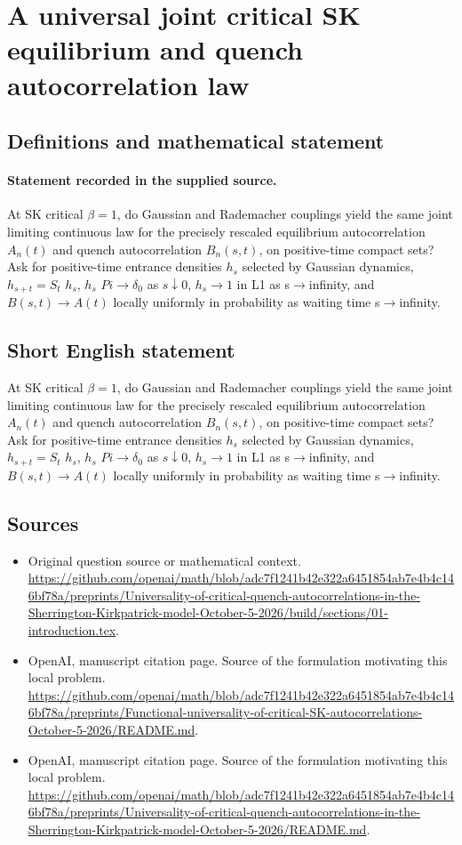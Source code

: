 \documentclass[11pt]{article}
\begin{document}
\section*{A universal joint critical SK equilibrium and quench autocorrelation law}\label{statement}
\subsection{Definitions and mathematical statement}
\paragraph{Statement recorded in the supplied source.}
At SK critical $\beta =1$, do Gaussian and Rademacher couplings yield the same joint limiting continuous law for the precisely rescaled equilibrium autocorrelation $A_n(t)$ and quench autocorrelation $B_n(s,t)$, on positive-time compact sets? Ask for positive-time entrance densities $h_s$ selected by Gaussian dynamics, $h_{s+t}=S_t$ $h_s$, $h_s$ $Pi\to \delta _0$ as $s\downarrow 0$, $h_s\to 1$ in L1 as s$\to$infinity, and $B(s,t)\to A(t)$ locally uniformly in probability as waiting time s$\to$infinity.
\subsection{Short English statement}
At SK critical $\beta =1$, do Gaussian and Rademacher couplings yield the same joint limiting continuous law for the precisely rescaled equilibrium autocorrelation $A_n(t)$ and quench autocorrelation $B_n(s,t)$, on positive-time compact sets? Ask for positive-time entrance densities $h_s$ selected by Gaussian dynamics, $h_{s+t}=S_t$ $h_s$, $h_s$ $Pi\to \delta _0$ as $s\downarrow 0$, $h_s\to 1$ in L1 as s$\to$infinity, and $B(s,t)\to A(t)$ locally uniformly in probability as waiting time s$\to$infinity.
\subsection{Sources}
\begin{itemize}
\item[S1] Original question source or mathematical context.
\url{https://github.com/openai/math/blob/adc7f1241b42e322a6451854ab7e4b4c146bf78a/preprints/Universality-of-critical-quench-autocorrelations-in-the-Sherrington-Kirkpatrick-model-October-5-2026/build/sections/01-introduction.tex}.
\item[S2] OpenAI, manuscript citation page. Source of the formulation motivating this local problem.
\url{https://github.com/openai/math/blob/adc7f1241b42e322a6451854ab7e4b4c146bf78a/preprints/Functional-universality-of-critical-SK-autocorrelations-October-5-2026/README.md}.
\item[S3] OpenAI, manuscript citation page. Source of the formulation motivating this local problem.
\url{https://github.com/openai/math/blob/adc7f1241b42e322a6451854ab7e4b4c146bf78a/preprints/Universality-of-critical-quench-autocorrelations-in-the-Sherrington-Kirkpatrick-model-October-5-2026/README.md}.
\end{itemize}
\end{document}
